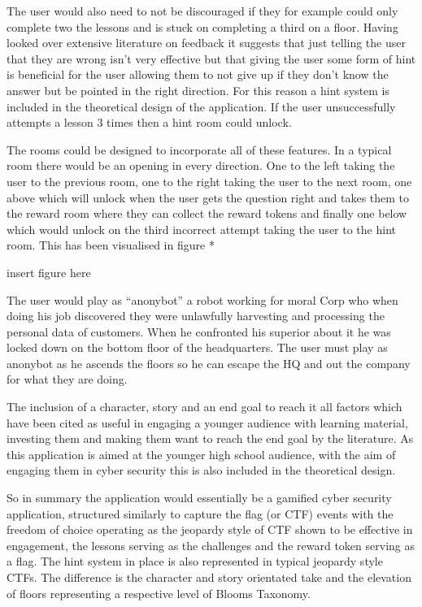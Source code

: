 \documentclass[12pt,a4paper]{article}
\begin{document}

The user would also need to not be discouraged if they for example could only complete two the lessons and is stuck on completing a third on a floor. Having looked over extensive literature on feedback it suggests that just telling the user that they are wrong isn’t very effective but that giving the user some form of hint is beneficial for the user allowing them to not give up if they don’t know the answer but be pointed in the right direction. For this reason a hint system is included in the theoretical design of the application.  If the user unsuccessfully attempts a lesson 3 times then a hint room could unlock. 

The rooms could be designed to incorporate all of these features. In a typical room there would be an opening in every direction. One to the left taking the user to the previous room, one to the right taking the user to the next room, one above which will unlock when the user gets the question right and takes them to the reward room where they can collect the reward tokens and finally one below which would unlock on the third incorrect attempt taking the user to the hint room. This has been visualised in figure * 

insert figure here  

The user would play as “anonybot” a robot working for moral Corp who when doing his job discovered they were unlawfully harvesting and processing the personal data of customers. When he confronted his superior about it he was locked down on the bottom floor of the headquarters. The user must play as anonybot as he ascends the floors so he can escape the HQ and out the company for what they are doing.  

The inclusion of a character, story and an end goal to reach it all factors which have been cited as useful in engaging a younger audience with learning material, investing them and making them want to reach the end goal by the literature. As this application is aimed at the younger high school audience, with the aim of engaging them in cyber security this is also included in the theoretical design. 

So in summary the application would essentially be a gamified cyber security application, structured similarly to capture the flag (or CTF) events with the freedom of choice operating as the jeopardy style of CTF shown to be effective in engagement, the lessons serving as the challenges and the reward token serving as a flag. The hint system in place is also represented in typical jeopardy style CTFs. The difference is the character and story orientated take and the elevation of floors representing a respective level of Blooms Taxonomy. 
\end{document}
